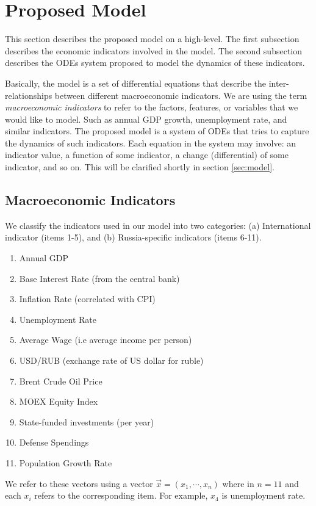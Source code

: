 
\section{Proposed Model}
This section describes the proposed model on a high-level.
The first subsection describes the economic indicators involved in the model.
The second subsection describes the ODEs system proposed to model the dynamics of these indicators.

Basically, the model is a set of differential equations that describe the inter-relationships between different macroeconomic indicators.
We are using the term \textit{macroeconomic indicators} to refer to the factors, features, or variables that we would like to model.
Such as annual GDP growth, unemployment rate, and similar indicators.
The proposed model is a system of ODEs that tries to capture the dynamics of such indicators.
Each equation in the system may involve:
an indicator value, a function of some indicator, a change (differential) of some indicator, and so on.
This will be clarified shortly in section \ref{sec:model}.

\subsection{Macroeconomic Indicators}
We classify the indicators used in our model into two categories:
(a) International indicator (items 1-5), and
(b) Russia-specific indicators (items 6-11).
\begin{enumerate}
\item Annual GDP
\item Base Interest Rate (from the central bank)
\item Inflation Rate (correlated with CPI)
\item Unemployment Rate
\item Average Wage (i.e average income per person)
\item USD/RUB (exchange rate of US dollar for ruble)
\item Brent Crude Oil Price
\item MOEX Equity Index
\item State-funded investments (per year)
\item Defense Spendings
\item Population Growth Rate
\end{enumerate}
We refer to these vectors using a vector
$\vec{x} = (x_1, \cdots, x_n)$
where in $n = 11$ and each $x_i$ refers to the corresponding item.
For example, $x_4$ is unemployment rate.

